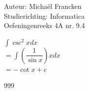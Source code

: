 \documentclass[a4paper]{article}
\newcommand{\dint}{\displaystyle\int}
\begin{document}
\noindent \large Auteur: Michaël Francken \\
\noindent \large Studierichting: Informatica\\
\noindent \large Oefeningenreeks 4A nr. 9.4\\

\medskip 

\normalsize

$\dint\csc^2 xdx$\\

$=\dint \left(\dfrac{1}{\sin x} \right)xdx$\\

$=-\cot x+c$\\

\begin{thebibliography}{999}
\end{thebibliography}
\end{document}
